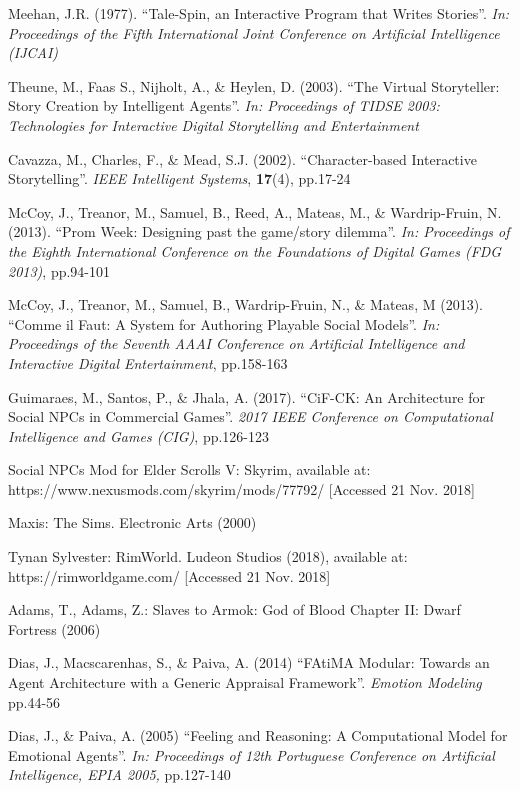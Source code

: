 \documentclass{sig-alternate-05-2015}
\begin{document}
\begin{thebibliography}{20}
Meehan, J.R. (1977).
``Tale-Spin, an Interactive Program that Writes Stories''.
\textit{In: Proceedings of the Fifth International Joint Conference on Artificial Intelligence (IJCAI)}

Theune, M., Faas S., Nijholt, A., \& Heylen, D. (2003).
``The Virtual Storyteller: Story Creation by Intelligent Agents''.
\textit{In: Proceedings of TIDSE 2003: Technologies for Interactive Digital Storytelling and Entertainment}

Cavazza, M., Charles, F., \& Mead, S.J. (2002).
``Character-based Interactive Storytelling''.
\textit{IEEE Intelligent Systems}, \textbf{17}(4), pp.17-24

McCoy, J., Treanor, M., Samuel, B., Reed, A., Mateas, M., \& Wardrip-Fruin, N. (2013).
``Prom Week: Designing past the game/story dilemma''.
\textit{In: Proceedings of the Eighth International Conference on the Foundations of Digital Games (FDG 2013)}, pp.94-101

McCoy, J., Treanor, M., Samuel, B., Wardrip-Fruin, N., \& Mateas, M (2013).
``Comme il Faut: A System for Authoring Playable Social Models''.
\textit{In: Proceedings of the Seventh AAAI Conference on Artificial Intelligence and Interactive Digital Entertainment}, pp.158-163

Guimaraes, M., Santos, P., \& Jhala, A. (2017).
``CiF-CK: An Architecture for Social NPCs in Commercial Games''.
\textit{2017 IEEE Conference on Computational Intelligence and Games (CIG)}, pp.126-123

Social NPCs Mod for Elder Scrolls V: Skyrim, available at: https://www.nexusmods.com/skyrim/mods/77792/ [Accessed 21 Nov. 2018]

Maxis: The Sims. Electronic Arts (2000)

Tynan Sylvester: RimWorld. Ludeon Studios (2018), available at: https://rimworldgame.com/ [Accessed 21 Nov. 2018]

Adams, T., Adams, Z.: Slaves to Armok: God of Blood Chapter II: Dwarf Fortress (2006)

Dias, J., Macscarenhas, S., \& Paiva, A. (2014)
``FAtiMA Modular: Towards an Agent Architecture with
a Generic Appraisal Framework''.
\textit{Emotion Modeling} pp.44-56

Dias, J., \& Paiva, A. (2005)
``Feeling and Reasoning: A Computational Model for Emotional Agents''.
\textit{In: Proceedings of 12th Portuguese Conference on Artificial Intelligence, EPIA 2005,} pp.127-140


\end{thebibliography}
\end{document}

